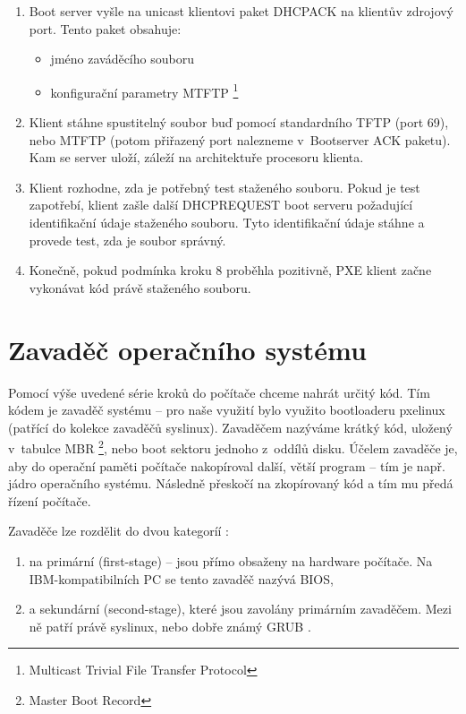 \begin{enumerate}
\item  Boot server vyšle na unicast klientovi paket DHCPACK na klientův zdrojový port. Tento paket obsahuje:

\begin{itemize}
\item jméno zaváděcího souboru
\item konfigurační parametry MTFTP \footnote{Multicast Trivial File Transfer Protocol}
\end{itemize}

\item  Klient stáhne spustitelný soubor buď pomocí standardního TFTP (port 69), nebo MTFTP (potom přiřazený port nalezneme v~Bootserver ACK paketu). Kam se server uloží, záleží na architektuře procesoru klienta.
\item  Klient rozhodne, zda je potřebný test staženého souboru. Pokud je test zapotřebí, klient zašle další DHCPREQUEST boot serveru požadující identifikační údaje staženého souboru. Tyto identifikační údaje stáhne a provede test, zda je soubor správný.

\item  Konečně, pokud podmínka kroku 8 proběhla pozitivně, PXE klient začne vykonávat kód právě staženého souboru.
\end{enumerate}

\section{Zavaděč operačního systému}

Pomocí výše uvedené série kroků do počítače chceme nahrát určitý kód. Tím kódem je zavaděč systému -- pro naše využití bylo využito bootloaderu pxelinux (patřící do kolekce zavaděčů syslinux). Zavaděčem nazýváme krátký kód, uložený v~tabulce MBR \footnote{Master Boot Record}, nebo boot sektoru jednoho z~oddílů disku. Účelem zavaděče je, aby do operační paměti počítače nakopíroval další, větší program -- tím je např. jádro operačního systému. Následně přeskočí na zkopírovaný kód a tím mu předá řízení počítače.


Zavaděče lze rozdělit do dvou kategoríí \cite{syslinux-abc}:
\begin{enumerate}

\item na primární (first-stage) -- jsou přímo obsaženy na hardware počítače. Na IBM-kompatibilních PC se tento zavaděč nazývá BIOS,
\item a sekundární (second-stage), které jsou zavolány primárním zavaděčem. Mezi ně patří právě syslinux, nebo dobře známý GRUB \cite{grub}.
\end{enumerate}

